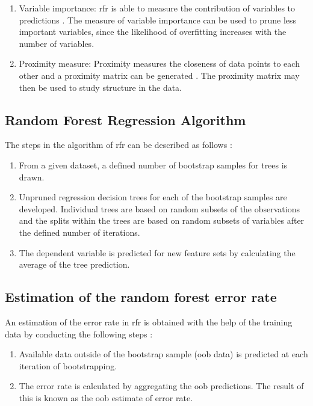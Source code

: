 \documentclass[a4paper, 11pt, oneside]{Thesis}  %
\begin{document}
\begin{enumerate}
\item	 Variable importance: \ac{rfr} is able to measure the contribution of variables to predictions \cite{Liaw.2002}. The measure of variable importance can be used to prune less important variables, since the likelihood of overfitting increases with the number of variables.
\item Proximity measure: Proximity measures the closeness of data points to each other and a proximity matrix can be generated \cite{Liaw.2002}. The proximity matrix may then be used to study structure in the data.
\end{enumerate}

\subsection{Random Forest Regression Algorithm}

The steps in the algorithm of \ac{rfr} can be described as follows \cite{Liaw.2002}:

\begin{enumerate}
\item	From a given dataset, a defined number of bootstrap samples for trees is drawn.
\item Unpruned regression decision trees for each of the bootstrap samples are developed. Individual trees are based on random subsets of the observations and the splits within the trees are based on random subsets of variables after the defined number of iterations.
\item The dependent variable is predicted for new feature sets by calculating the average of the tree prediction.
\end{enumerate}

\subsection{Estimation of the random forest error rate}
An estimation of the error rate in \ac{rfr} is obtained with the help of the training data by conducting the following steps \cite{Liaw.2002}:

\begin{enumerate}
\item Available data outside of the bootstrap sample (\ac{oob} data) is predicted at each iteration of bootstrapping.
\item The error rate is calculated by aggregating the \ac{oob} predictions. The result of this is known as the \ac{oob} estimate of error rate.
\end{enumerate}
 
\end{document}
